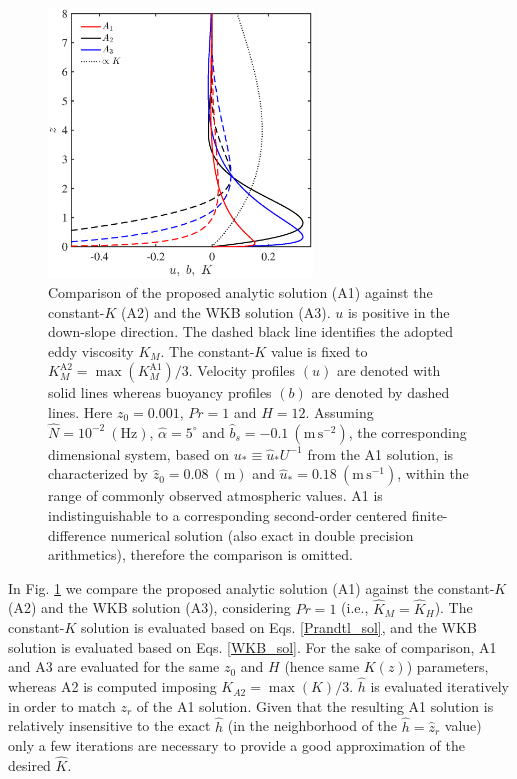 \begin{figure}
   \begin{center}
      \includegraphics[width= 70.0mm]{comparison_analytic_solutions.eps}
      \caption{Comparison of the proposed analytic solution (A1) against the constant-$K$ (A2) and the WKB solution (A3). $u$ is positive in the down-slope direction. The dashed black line identifies the adopted eddy viscosity $K_M$. The constant-$K$ value is fixed to $K_M^{\mathrm{A2}} = \max(K_M^{\mathrm{A1}})/3$. Velocity profiles $(u)$ are denoted with solid lines whereas buoyancy profiles $(b)$ are denoted by dashed lines. Here $z_0 = 0.001, \, Pr=1$ and $H = 12$. Assuming $\hat{N}=10^{-2} \ \mathrm{(Hz)}$, $\hat{\alpha}=5^{\circ}$ and $\hat{b}_s = -0.1 \ \mathrm{(m \, s^{-2})}$, the corresponding dimensional system, based on $u_* \equiv \hat{u}_* U^{-1}$ from the A1 solution, is characterized by $\hat{z}_0 = 0.08 \ \mathrm{(m)}$ and $\hat{u}_* = 0.18 \ \mathrm{(m \, s^{-1})}$, within the range of commonly observed atmospheric values. 
      A1 is indistinguishable to a corresponding second-order centered finite-difference numerical solution (also exact in double precision arithmetics), therefore the comparison is omitted.}
      \label{fig1}
   \end{center}
\end{figure}
%
In Fig. \ref{fig1} we compare the proposed analytic solution (A1) against the constant-$K$ (A2) and the WKB solution (A3), considering $Pr=1$ (i.e., $\hat{K}_M = \hat{K}_H$).
The constant-$K$ solution is evaluated based on Eqs. \ref{Prandtl_sol}, and the WKB solution is evaluated based on Eqs. \ref{WKB_sol}. 
For the sake of comparison, A1 and A3 are evaluated for the same $z_0$ and $H$ (hence same $K(z)$) parameters, whereas A2 is computed imposing $K_{A2} = \max{(K)}/3$.
$\hat{h}$ is evaluated iteratively in order to match $z_r$ of the A1 solution. Given that the resulting A1 solution is relatively insensitive to the exact $\hat{h}$ (in the neighborhood of the $\hat{h}=\hat{z}_r$ value) only a few iterations are necessary to provide a good approximation of the desired $\hat{K}$.
